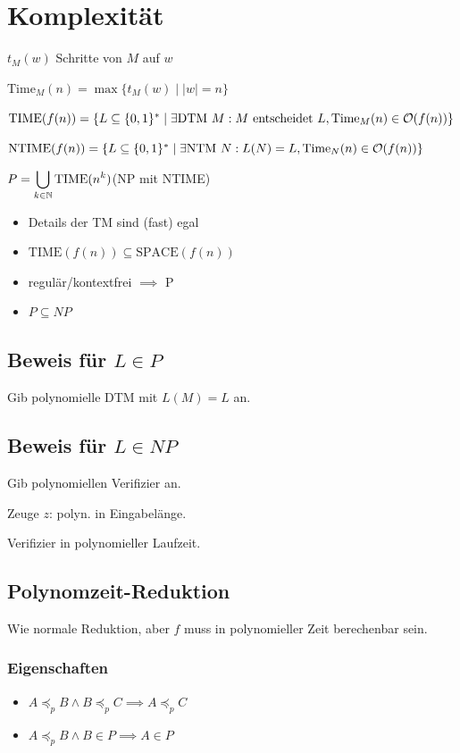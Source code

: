 \section*{Komplexität}
$t_M(w)$ Schritte von $M$ auf $w$

$\text{Time}_M(n) = \max\{t_M(w) \mid |w|=n\}$

$\text{TIME}(f(n)) = \{L \subseteq \{0,1\}^* \mid \exists \text{DTM $M$}: \text{$M$ entscheidet $L$}, \text{Time}_M(n)\in\mathcal{O}(f(n))\}$

$\text{NTIME}(f(n)) = \{L \subseteq \{0,1\}^* \mid \exists \text{NTM $N$}: L(N)=L, \text{Time}_N(n)\in\mathcal{O}(f(n))\}$

$\displaystyle P = \bigcup_{k\in\mathbb{N}}\text{TIME}(n^k)$\quad (NP mit NTIME)

\begin{itemize}
	\item Details der TM sind (fast) egal
	\item $\text{TIME}(f(n)) \subseteq \text{SPACE}(f(n))$
	\item regulär/kontextfrei $\implies$ P
	\item $P \subseteq NP$
\end{itemize}

\subsection*{Beweis für $L \in P$}
Gib polynomielle DTM mit $L(M)=L$ an.

\subsection*{Beweis für $L \in NP$}
Gib polynomiellen Verifizier an.

Zeuge $z$: polyn. in Eingabelänge.

Verifizier in polynomieller Laufzeit.

\subsection*{Polynomzeit-Reduktion}
Wie normale Reduktion, aber $f$ muss in polynomieller Zeit berechenbar sein.

\subsubsection*{Eigenschaften}
\begin{itemize}
	\item $A \preceq_p B \land B \preceq_p C \implies A \preceq_p C$
	\item $A \preceq_p B \land B \in P \implies A \in P$
\end{itemize}

